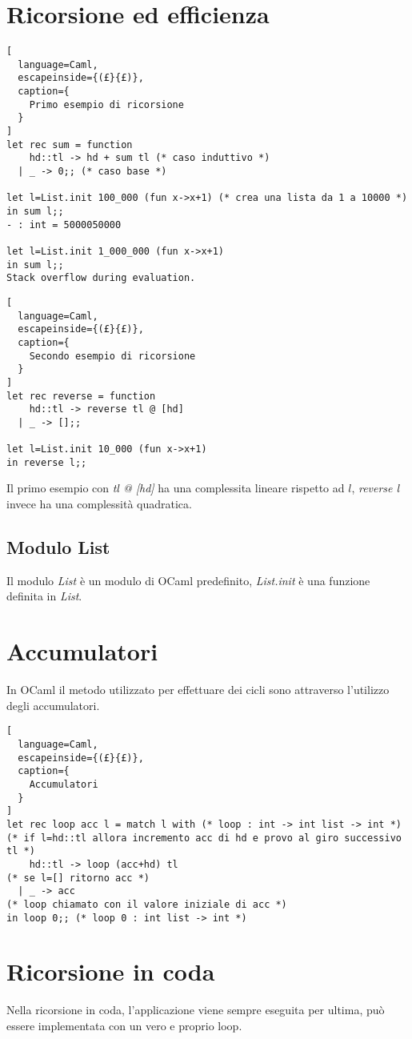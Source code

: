 \section{Ricorsione ed efficienza}
\begin{lstlisting}[
  language=Caml,
  escapeinside={(£}{£)},
  caption={
    Primo esempio di ricorsione
  }
]
let rec sum = function
    hd::tl -> hd + sum tl (* caso induttivo *)
  | _ -> 0;; (* caso base *)

let l=List.init 100_000 (fun x->x+1) (* crea una lista da 1 a 10000 *)
in sum l;;
- : int = 5000050000

let l=List.init 1_000_000 (fun x->x+1)
in sum l;;
Stack overflow during evaluation.
\end{lstlisting}

\begin{lstlisting}[
  language=Caml,
  escapeinside={(£}{£)},
  caption={
    Secondo esempio di ricorsione
  }
]
let rec reverse = function
    hd::tl -> reverse tl @ [hd]
  | _ -> [];;

let l=List.init 10_000 (fun x->x+1)
in reverse l;;
\end{lstlisting}

Il primo esempio con \emph{tl @ [hd]} ha una complessita lineare rispetto ad
$l$, \emph{reverse l} invece ha una complessità quadratica.
\subsection{Modulo List}
Il modulo \emph{List} è un modulo di OCaml predefinito, \emph{List.init} è una
funzione definita in \emph{List}.


\section{Accumulatori}
In OCaml il metodo utilizzato per effettuare dei cicli sono attraverso
l'utilizzo degli accumulatori.

\begin{lstlisting}[
  language=Caml,
  escapeinside={(£}{£)},
  caption={
    Accumulatori
  }
]
let rec loop acc l = match l with (* loop : int -> int list -> int *)
(* if l=hd::tl allora incremento acc di hd e provo al giro successivo tl *)
    hd::tl -> loop (acc+hd) tl
(* se l=[] ritorno acc *)
  | _ -> acc
(* loop chiamato con il valore iniziale di acc *)
in loop 0;; (* loop 0 : int list -> int *)
\end{lstlisting}

\section{Ricorsione in coda}
Nella ricorsione in coda, l'applicazione viene sempre eseguita per ultima, può
essere implementata con un vero e proprio loop.

